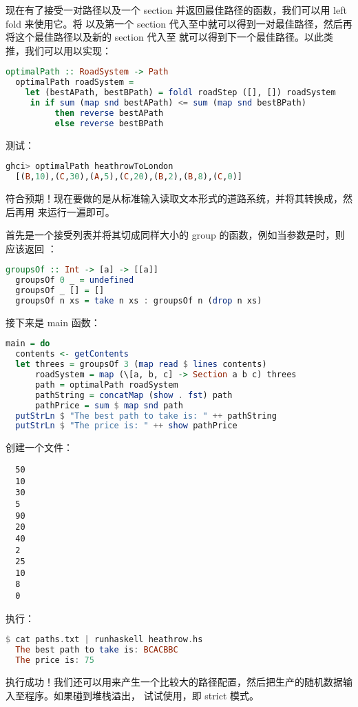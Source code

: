 \documentclass[./main.tex]{subfiles}
\begin{document}
现在有了接受一对路径以及一个 section 并返回最佳路径的函数，我们可以用 left fold 来使用它。将\acode{([],[])}
以及第一个 section 代入至中就可以得到一对最佳路径，然后再将这个最佳路径以及新的 section 代入至
就可以得到下一个最佳路径。以此类推，我们可以用以实现：

\begin{lstlisting}[language=Haskell]
  optimalPath :: RoadSystem -> Path
  optimalPath roadSystem =
    let (bestAPath, bestBPath) = foldl roadStep ([], []) roadSystem
     in if sum (map snd bestAPath) <= sum (map snd bestBPath)
          then reverse bestAPath
          else reverse bestBPath
\end{lstlisting}

测试：

\begin{lstlisting}[language=Haskell]
  ghci> optimalPath heathrowToLondon
  [(B,10),(C,30),(A,5),(C,20),(B,2),(B,8),(C,0)]
\end{lstlisting}

符合预期！现在要做的是从标准输入读取文本形式的道路系统，并将其转换成，然后再用
来运行一遍即可。

首先是一个接受列表并将其切成同样大小的 group 的函数，例如当参数是\acode{[1..10]}时，则应该返回
\acode{[[1,2,3],[4,5,6],[7,8,9],[10]]}：

\begin{lstlisting}[language=Haskell]
  groupsOf :: Int -> [a] -> [[a]]
  groupsOf 0 _ = undefined
  groupsOf _ [] = []
  groupsOf n xs = take n xs : groupsOf n (drop n xs)
\end{lstlisting}

接下来是 main 函数：

\begin{lstlisting}[language=Haskell]
  main = do
  contents <- getContents
  let threes = groupsOf 3 (map read $ lines contents)
      roadSystem = map (\[a, b, c] -> Section a b c) threes
      path = optimalPath roadSystem
      pathString = concatMap (show . fst) path
      pathPrice = sum $ map snd path
  putStrLn $ "The best path to take is: " ++ pathString
  putStrLn $ "The price is: " ++ show pathPrice
\end{lstlisting}

创建一个文件：

\begin{lstlisting}
  50
  10
  30
  5
  90
  20
  40
  2
  25
  10
  8
  0
\end{lstlisting}

执行：

\begin{lstlisting}[language=Haskell]
  $ cat paths.txt | runhaskell heathrow.hs
  The best path to take is: BCACBBC
  The price is: 75
\end{lstlisting}

执行成功！我们还可以用来产生一个比较大的路径配置，然后把生产的随机数据输入至程序。如果碰到堆栈溢出，
试试使用，即 strict 模式。
\end{document}
